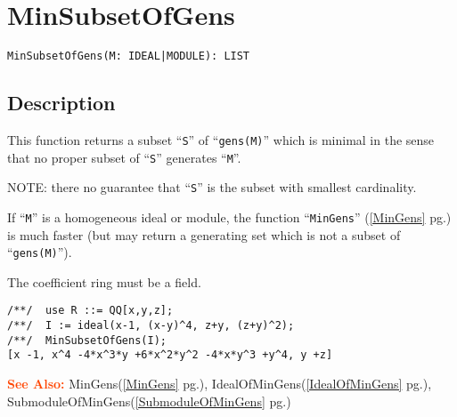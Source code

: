 \documentclass[a4paper]{mybook}
\newenvironment{command}{}{} %
\newcommand\SeeAlso{\par\textcolor{OrangeRed}{\textbf{\large See Also: }}}
\begin{document}
\section{MinSubsetOfGens}
\label{MinSubsetOfGens}
\begin{command} %


\begin{Verbatim}[label=syntax, rulecolor=\color{MidnightBlue},
frame=single]
MinSubsetOfGens(M: IDEAL|MODULE): LIST
\end{Verbatim}


\subsection*{Description}

This function returns a subset ``\verb&S&'' of ``\verb&gens(M)&'' which is
minimal in the sense that no proper subset of ``\verb&S&'' generates ``\verb&M&''.
\par 
NOTE: there no guarantee that ``\verb&S&'' is the subset with smallest cardinality.
\par 
If ``\verb&M&'' is a homogeneous ideal or module, the function
``\verb&MinGens&'' (\ref{MinGens} pg.\pageref{MinGens}) is much faster (but may return a generating set
which is not a subset of ``\verb&gens(M)&'').
\par 
The coefficient ring must be a field.
\begin{Verbatim}[label=example, rulecolor=\color{PineGreen}, frame=single]
/**/  use R ::= QQ[x,y,z];
/**/  I := ideal(x-1, (x-y)^4, z+y, (z+y)^2);
/**/  MinSubsetOfGens(I);
[x -1, x^4 -4*x^3*y +6*x^2*y^2 -4*x*y^3 +y^4, y +z]
\end{Verbatim}


\SeeAlso %
  MinGens(\ref{MinGens} pg.\pageref{MinGens}), 
    IdealOfMinGens(\ref{IdealOfMinGens} pg.\pageref{IdealOfMinGens}), 
    SubmoduleOfMinGens(\ref{SubmoduleOfMinGens} pg.\pageref{SubmoduleOfMinGens})
\end{command} %
\end{document}
